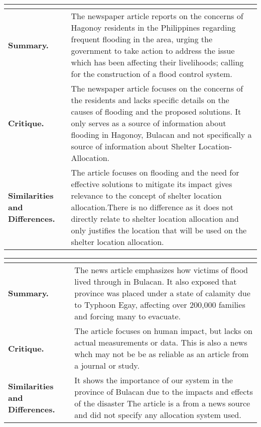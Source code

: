 \begin{longtable}{|L{.2\linewidth}|L{.74\linewidth}|}
	\hline
	\\ \hline
	\textbf{Summary.} & The newspaper article reports on the concerns of Hagonoy residents in the Philippines regarding frequent flooding in the area, urging the government to take action to address the issue which has been affecting their livelihoods; calling for the construction of a flood control system.\\ \hline
	\textbf{Critique.} & The newspaper article focuses on the concerns of the residents and lacks specific details on the causes of flooding and the proposed solutions. It only serves as a source of information about flooding in Hagonoy, Bulacan and not specifically a source of information about Shelter Location-Allocation.\\ \hline
	\textbf{Similarities and Differences.} & The article focuses on flooding and the need for effective solutions to mitigate its impact gives relevance to the concept of shelter location allocation.There is no difference as it does not directly relate to shelter location allocation and only justifies the location that will be used on the shelter location allocation.\\ \hline
\end{longtable}

\begin{longtable}{|L{.2\linewidth}|L{.74\linewidth}|}
	\hline
	\\ \hline
	\textbf{Summary.} & The news article emphasizes how victims of flood lived through in Bulacan. It also exposed that province was placed under a state of calamity due to Typhoon Egay, affecting over 200,000 families and forcing many to evacuate.\\ \hline
	\textbf{Critique.} & The article focuses on human impact, but lacks on actual measurements or data. This is also a news whch may not be be as reliable as an article from a journal or study.\\ \hline
	\textbf{Similarities and Differences.} & It shows the importance of our system in the province of Bulacan due to the impacts and effects of the disaster The article is a from a news source and did not specify any allocation system used.\\ \hline
\end{longtable}